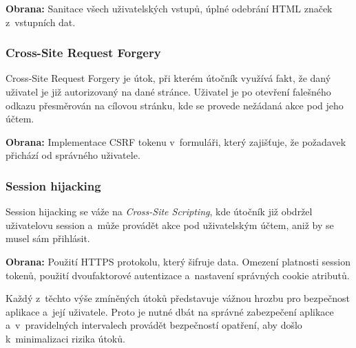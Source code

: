 \textbf{Obrana:} Sanitace všech uživatelských vstupů, úplné odebrání HTML značek z~vstupních dat.

\subsubsection*{Cross-Site Request Forgery}
\label{subsubsec:security-attacks-cross-site-request-forgery}
Cross-Site Request Forgery je útok, při kterém útočník využívá fakt, že daný uživatel je již autorizovaný na dané stránce. Uživatel je po otevření falešného odkazu přesměrován na cílovou stránku, kde se provede nežádaná akce pod jeho účtem.

\textbf{Obrana:} Implementace CSRF tokenu v~formuláři, který zajišťuje, že požadavek přichází od správného uživatele.

\subsubsection*{Session hijacking}
\label{subsubsec:security-attacks-session-hijacking}
Session hijacking se váže na \textit{Cross-Site Scripting}, kde útočník již obdržel uživatelovu session a~může provádět akce pod uživatelským účtem, aniž by se musel sám přihlásit.

\textbf{Obrana:} Použití HTTPS protokolu, který šifruje data. Omezení platnosti session tokenů, použití dvoufaktorové autentizace a~nastavení správných cookie atributů.
\newline

Každý z~těchto výše zmíněných útoků představuje vážnou hrozbu pro bezpečnost aplikace a~její uživatele. Proto je nutné dbát na správné zabezpečení aplikace a~v~pravidelných intervalech provádět bezpečností opatření, aby došlo k~minimalizaci rizika útoků.

\endinput
